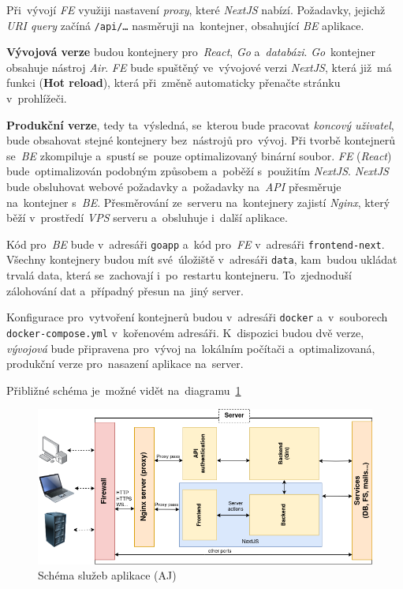 \documentclass[11pt,a4paper]{report}
\let\oldacrshort\acrshort
\renewcommand{\acrshort}[1]{\emph{\normalsize\color[rgb]{0,0,0}\noindent\oldacrshort{#1}}}
\begin{document}
        Při~vývojí \acrshort{FE} využiji nastavení \emph{proxy}, které \emph{NextJS} nabízí. Požadavky, jejichž \emph{URI query} začíná \texttt{/api/\dots} nasměruji na~kontejner, obsahující \acrshort{BE} aplikace.
        
        \textbf{Vývojová verze} budou kontejnery pro~\emph{React}, \emph{Go} a~\emph{databázi}. \emph{Go}~kontejner obsahuje nástroj \emph{Air}. \acrshort{FE} bude spuštěný ve~vývojové verzi \emph{NextJS}, která již~má funkci (\textbf{Hot reload}), která při~změně automaticky přenačte stránku v~prohlížeči.

        \textbf{Produkční verze}, tedy ta~výsledná, se~kterou bude pracovat \emph{koncový uživatel}, bude obsahovat stejné kontejnery bez~nástrojů pro~vývoj. Při tvorbě kontejnerů se~\acrshort{BE} zkompiluje a~spustí se~pouze optimalizovaný binární soubor. \acrshort{FE} (\emph{React}) bude~optimalizován podobným způsobem a~poběží s~použitím \emph{NextJS}. \emph{NextJS} bude obsluhovat webové požadavky a~požadavky na~\acrshort{API} přesměruje na~kontejner s~\acrshort{BE}. Přesměrování ze~serveru na~kontejnery zajistí \emph{Nginx}, který běží v~prostředí \emph{VPS} serveru a~obsluhuje i~další aplikace.

        Kód pro~\acrshort{BE} bude v~adresáři \texttt{goapp} a~kód pro~\acrshort{FE} v~adresáři \texttt{frontend-next}. Všechny kontejnery budou mít své~úložiště v~adresáři \texttt{data}, kam~budou ukládat trvalá data, která se~zachovají i~po~restartu kontejneru. To~zjednoduší zálohování dat a~případný přesun na~jiný server.

        Konfigurace pro~vytvoření kontejnerů budou v~adresáři \texttt{docker} a~v~souborech \texttt{docker-compose.yml} v~kořenovém adresáři. K~dispozici budou dvě verze, \emph{vývojová} bude připravena pro~vývoj na~lokálním počítači a~optimalizovaná, produkční verze pro~nasazení aplikace na~server.

        Přibližné schéma je~možné vidět na~diagramu~\ref{fig:appschema}
        
        \begin{figure}
            \centering
            \includegraphics[width=16cm]{files/img/server_scheme.png}
            \caption{Schéma služeb aplikace (AJ)}
            \label{fig:appschema}
        \end{figure}
        
\end{document}

